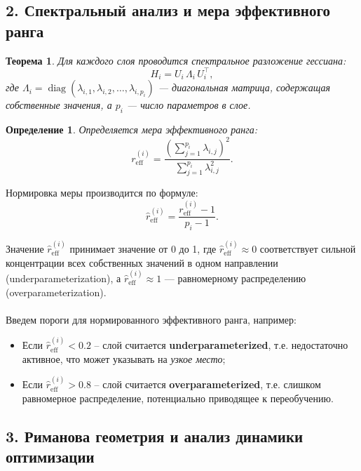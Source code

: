 \documentclass[a4paper,12pt]{article}
\newtheorem{theorem}{Теорема}
\newtheorem{definition}{Определение}
\begin{document}
\subsection*{2. Спектральный анализ и мера эффективного ранга}

\begin{theorem}
Для каждого слоя проводится спектральное разложение гессиана:
\begin{equation}
    H_i = U_i\,\Lambda_i\,U_i^\top,
\end{equation}
где \(\Lambda_i = \operatorname{diag}(\lambda_{i,1}, \lambda_{i,2}, \dots, \lambda_{i,p_i})\) --- диагональная матрица, содержащая собственные значения, а \(p_i\) --- число параметров в слое.
\end{theorem}

\begin{definition}
Определяется мера эффективного ранга:
\begin{equation}
    r_{\text{eff}}^{(i)} = \frac{\left(\sum_{j=1}^{p_i} \lambda_{i,j}\right)^2}{\sum_{j=1}^{p_i}\lambda_{i,j}^2}.
\end{equation}
\end{definition}

Нормировка меры производится по формуле:
\begin{equation}
    \hat{r}_{\text{eff}}^{(i)} = \frac{r_{\text{eff}}^{(i)} - 1}{p_i - 1}.
\end{equation}

Значение \(\hat{r}_{\text{eff}}^{(i)}\) принимает значение от 0 до 1, где \(\hat{r}_{\text{eff}}^{(i)} \approx 0\) соответствует сильной концентрации всех собственных значений в одном направлении (underparameterization), а \(\hat{r}_{\text{eff}}^{(i)} \approx 1\) --- равномерному распределению (overparameterization).\\\\
Введем пороги для нормированного эффективного ранга, например:
\begin{itemize}[leftmargin=0.5cm]
\item Если \(\hat{r}_{\text{eff}}^{(i)} < 0.2\) – слой считается \textbf{underparameterized}, т.е. недостаточно активное, что может указывать на \textit{узкое место};
\item Если \(\hat{r}_{\text{eff}}^{(i)} > 0.8\) – слой считается \textbf{overparameterized}, т.е. слишком равномерное распределение, потенциально приводящее к переобучению.
\end{itemize}

\subsection*{3. Риманова геометрия и анализ динамики оптимизации}
\end{document}
